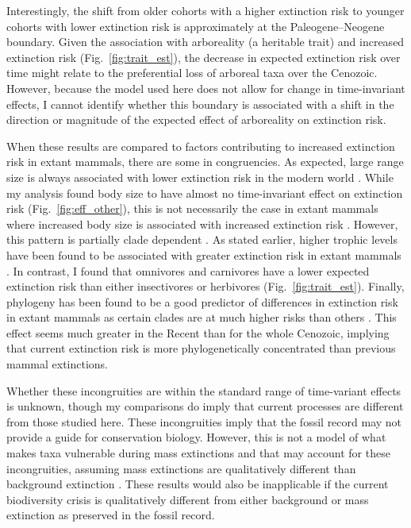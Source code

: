 \documentclass[12pt]{article}
\begin{document}
Interestingly, the shift from older cohorts with a higher extinction risk to younger cohorts with lower extinction risk is approximately at the Paleogene--Neogene boundary. Given the association with arboreality (a heritable trait) and increased extinction risk (Fig.~\ref{fig:trait_est}), the decrease in expected extinction risk over time might relate to the preferential loss of arboreal taxa over the Cenozoic. However, because the model used here does not allow for change in time-invariant effects, I cannot identify whether this boundary is associated with a shift in the direction or magnitude of the expected effect of arboreality on extinction risk.

When these results are compared to factors contributing to increased extinction risk in extant mammals, there are some in congruencies. As expected, large range size is always associated with lower extinction risk in the modern world \cite{Fritz2009,Fritz2010b,Liow2009,Purvis2000a}. While my analysis found body size to have almost no time-invariant effect on extinction risk (Fig.~\ref{fig:eff_other}), this is not necessarily the case in extant mammals where increased body size is associated with increased extinction risk \cite{Liow2009,Purvis2000a}. However, this pattern is partially clade dependent \cite{Fritz2009}. As stated earlier, higher trophic levels have been found to be associated with greater extinction risk in extant mammals \cite{Purvis2000a,Liow2009}. In contrast, I found that omnivores and carnivores have a lower expected extinction risk than either insectivores or herbivores (Fig.~\ref{fig:trait_est}). Finally, phylogeny has been found to be a good predictor of differences in extinction risk in extant mammals as certain clades are at much higher risks than others \cite{Fritz2010b}. This effect seems much greater in the Recent than for the whole Cenozoic, implying that current extinction risk is more phylogenetically concentrated than previous mammal extinctions. 

Whether these incongruities are within the standard range of time-variant effects is unknown, though my comparisons do imply that current processes are different from those studied here. These incongruities imply that the fossil record may not provide a guide for conservation biology. However, this is not a model of what makes taxa vulnerable during mass extinctions and that may account for these incongruities, assuming mass extinctions are qualitatively different than background extinction \cite{Jablonski1986}. These results would also be inapplicable if the current biodiversity crisis is qualitatively different from either background or mass extinction as preserved in the fossil record.
\end{document}
